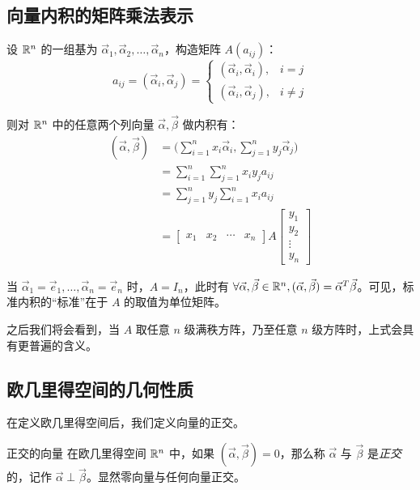 \subsection{向量内积的矩阵乘法表示}

设 $\mathbb R^n$ 的一组基为 $\vec \alpha_1, \vec \alpha_2, \ldots, \vec \alpha_n$，构造矩阵 $A(a_{ij})$：
$$
a_{ij} = (\vec \alpha_i, \vec \alpha_j) =
\begin{cases}
	(\vec \alpha_i, \vec \alpha_i), & i = j
	\\
	(\vec \alpha_i, \vec \alpha_j), & i \ne j
\end{cases}
$$

则对 $\mathbb R^n$ 中的任意两个列向量 $\vec \alpha, \vec \beta$ 做内积有：
$$
\begin{aligned}
	(\vec \alpha, \vec \beta) &= \biggl( \sum\limits_{i = 1}^n x_i \vec \alpha_i, \sum\limits_{j = 1}^n y_j \vec \alpha_j \biggr)
	\\&=
	\sum\limits_{i = 1}^n \sum\limits_{j = 1}^n x_i y_j a_{ij}
	\\&=
	\sum\limits_{j = 1}^n y_j \sum\limits_{i = 1}^n x_i a_{ij}
	\\&=
	\begin{bmatrix} x_1 & x_2 & \cdots & x_n \end{bmatrix} A \begin{bmatrix} y_1 \\ y_2 \\ \vdots \\ y_n \end{bmatrix}
\end{aligned}
$$

当 $\vec \alpha_1 = \vec e_1, \ldots, \vec \alpha_n = \vec e_n$ 时，$A = I_n$，此时有 $\forall \vec \alpha, \vec \beta \in \mathbb R^n, (\vec \alpha, \vec \beta) = \vec \alpha^T \vec \beta$。可见，标准内积的“标准”在于 $A$ 的取值为单位矩阵。

之后我们将会看到，当 $A$ 取任意 $n$ 级满秩方阵，乃至任意 $n$ 级方阵时，上式会具有更普遍的含义。

\subsection{欧几里得空间的几何性质}

在定义欧几里得空间后，我们定义向量的正交。

\begin{definition}{正交的向量}
	在欧几里得空间 $\mathbb R^n$ 中，如果 $(\vec \alpha, \vec \beta) = 0$，那么称 $\vec \alpha$ 与 $\vec \beta$ 是\emph{正交}的，记作 $\vec \alpha \perp \vec \beta$。显然零向量与任何向量正交。
\end{definition}

